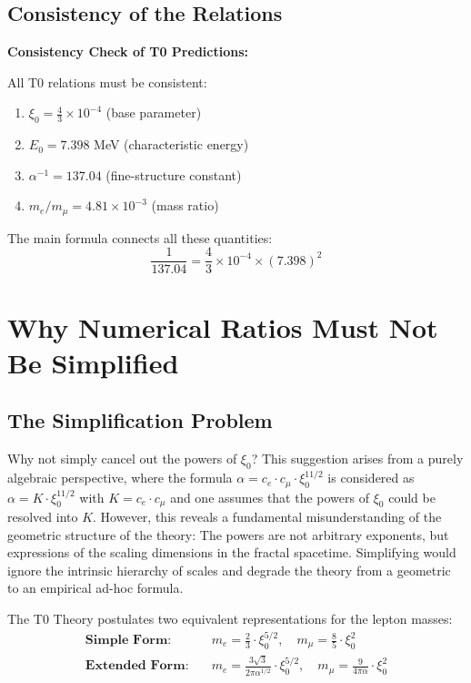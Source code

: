 \documentclass[12pt,a4paper]{article}
\newcommand{\xipar}{\xi_0}
\newcommand{\Ezero}{E_0}
\begin{document}
	
	\subsection{Consistency of the Relations}
	
	\begin{keyresult}
		\textbf{Consistency Check of T0 Predictions:}
		
		All T0 relations must be consistent:
		\begin{enumerate}
			\item $\xipar = \frac{4}{3} \times 10^{-4}$ (base parameter)
			\item $\Ezero = 7.398$ MeV (characteristic energy)
			\item $\alpha^{-1} = 137.04$ (fine-structure constant)
			\item $m_e/m_\mu = 4.81 \times 10^{-3}$ (mass ratio)
		\end{enumerate}
		
		The main formula connects all these quantities:
		\begin{equation}
			\frac{1}{137.04} = \frac{4}{3} \times 10^{-4} \times (7.398)^2
		\end{equation}
	\end{keyresult}
	
	
	\section{Why Numerical Ratios Must Not Be Simplified}
	
	\subsection{The Simplification Problem}
	Why not simply cancel out the powers of $\xipar$? This suggestion arises from a purely algebraic perspective, where the formula $\alpha = c_e \cdot c_\mu \cdot \xipar^{11/2}$ is considered as $\alpha = K \cdot \xipar^{11/2}$ with $K = c_e \cdot c_\mu$ and one assumes that the powers of $\xipar$ could be resolved into $K$. However, this reveals a fundamental misunderstanding of the geometric structure of the theory: The powers are not arbitrary exponents, but expressions of the scaling dimensions in the fractal spacetime. Simplifying would ignore the intrinsic hierarchy of scales and degrade the theory from a geometric to an empirical ad-hoc formula.
	
	The T0 Theory postulates two equivalent representations for the lepton masses:
	\begin{align*}
		\textbf{Simple Form:} &\quad m_e = \frac{2}{3} \cdot \xipar^{5/2}, \quad m_\mu = \frac{8}{5} \cdot \xipar^2 \\
		\textbf{Extended Form:} &\quad m_e = \frac{3\sqrt{3}}{2\pi\alpha^{1/2}} \cdot \xipar^{5/2}, \quad m_\mu = \frac{9}{4\pi\alpha} \cdot \xipar^2
	\end{align*}
	
\end{document}
